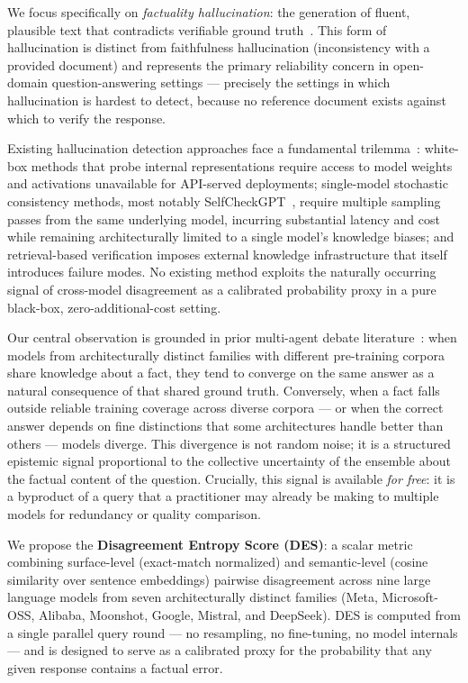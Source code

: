 \documentclass[journal]{IEEEtran}
\begin{document}
We focus specifically on \emph{factuality hallucination}: the generation of
fluent, plausible text that contradicts verifiable ground
truth~\cite{huang2024hallucination, farquhar2024detecting}.
This form of hallucination is distinct from faithfulness hallucination
(inconsistency with a provided document) and represents the primary
reliability concern in open-domain question-answering settings --- precisely
the settings in which hallucination is hardest to detect, because no
reference document exists against which to verify the response.

Existing hallucination detection approaches face a fundamental
trilemma~\cite{kuhn2023semantic, manakul2023selfcheckgpt, farquhar2024detecting}:
white-box methods that probe internal representations require access to
model weights and activations unavailable for API-served deployments;
single-model stochastic consistency methods, most notably
SelfCheckGPT~\cite{manakul2023selfcheckgpt}, require multiple sampling
passes from the same underlying model, incurring substantial latency and
cost while remaining architecturally limited to a single model's knowledge
biases; and retrieval-based verification imposes external knowledge
infrastructure that itself introduces failure modes.
No existing method exploits the naturally occurring signal of cross-model
disagreement as a calibrated probability proxy in a pure black-box,
zero-additional-cost setting.

Our central observation is grounded in prior multi-agent debate
literature~\cite{du2024multiagent, liang2023divergent}:
when models from architecturally distinct families with different pre-training
corpora share knowledge about a fact, they tend to converge on the same
answer as a natural consequence of that shared ground truth.
Conversely, when a fact falls outside reliable training coverage across
diverse corpora --- or when the correct answer depends on fine distinctions
that some architectures handle better than others --- models diverge.
This divergence is not random noise; it is a structured epistemic signal
proportional to the collective uncertainty of the ensemble about the
factual content of the question.
Crucially, this signal is available \emph{for free}: it is a byproduct of
a query that a practitioner may already be making to multiple models for
redundancy or quality comparison.

We propose the \textbf{Disagreement Entropy Score (DES)}: a scalar metric
combining surface-level (exact-match normalized) and semantic-level
(cosine similarity over sentence embeddings) pairwise disagreement across
nine large language models from seven architecturally distinct families
(Meta, Microsoft-OSS, Alibaba, Moonshot, Google, Mistral, and DeepSeek).
DES is computed from a single parallel query round --- no resampling, no
fine-tuning, no model internals --- and is designed to serve as a calibrated
proxy for the probability that any given response contains a factual error.
\end{document}
